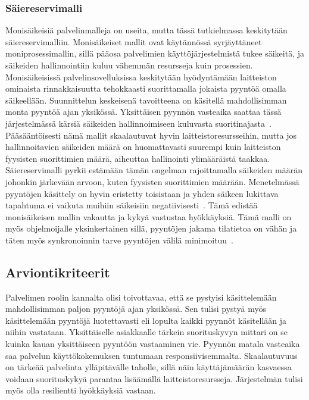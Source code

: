\documentclass[12pt]{article}
\begin{document}
\subsubsection{Säiereservimalli}
Monisäikeisiä palvelinmalleja on useita, mutta tässä tutkielmassa keskitytään säiereservimalliin.
Monisäikeiset mallit ovat käytännössä syrjäyttäneet moniprosessimallin, sillä pääosa
palvelimien käyttöjärjestelmistä tukee säikeitä, ja säikeiden hallinnointiin
kuluu vähemmän resursseja kuin prosessien.
Monisäikeisissä palvelinsovelluksissa keskitytään hyödyntämään laitteiston ominaista
rinnakkaisuutta tehokkaasti suorittamalla jokaista pyyntöä omalla säikeellään. Suunnittelun keskeisenä
tavoitteena on käsitellä mahdollisimman monta pyyntöä ajan yksikössä. Yksittäisen pyynnön
vasteaika saattaa tässä
järjestelmässä kärsiä säikeiden hallinnoimiseen kuluvasta suoritinajasta~\cite{easton_developing_2004}.
Pääsääntöisesti nämä mallit skaalautuvat hyvin laitteistoresursseihin,
mutta jos hallinnoitavien säikeiden määrä on huomattavasti suurempi kuin laitteiston
fyysisten suorittimien määrä, aiheuttaa hallinointi ylimääräistä taakkaa.
Säiereservimalli pyrkii estämään tämän ongelman rajoittamalla
säikeiden määrän johonkin järkevään arvoon, kuten fyysisten suorittimien
määrään.
Menetelmässä pyyntöjen käsittely on hyvin eristetty toisistaan ja
yhden säikeen lukittava tapahtuma ei vaikuta muihiin säikeisiin negatiivisesti~\cite{davis_case_2017}.
Tämä edistää monisäikeisen mallin vakautta ja kykyä vastustaa hyökkäyksiä.
Tämä malli on myös ohjelmoijalle yksinkertainen sillä, pyyntöjen jakama tilatietoa
on vähän ja täten myös synkronoinnin tarve pyyntöjen välilä minimoituu~\cite{hu_applying_1998}.



\subsection{Arviontikriteerit}
Palvelimen roolin kannalta olisi toivottavaa, että
se pystyisi käsittelemään mahdollisimman paljon pyyntöjä
ajan yksikössä. Sen tulisi pystyä myös käsittelemään pyyntöjä
luotettavasti eli lopulta kaikki pyynnöt käsitellään ja niihin vastataan.
Yksittäiselle asiakkaalle tärkein suorituskyvyn mittari on se kuinka kauan
yksittäiseen pyyntöön vastaaminen vie. Pyynnön matala vasteaika saa
palvelun käyttökokemuksen tuntumaan responsiivisemmalta.
Skaalautuvuus on tärkeää palvelinta ylläpitävälle taholle, sillä
näin käyttäjämäärän kasvaessa voidaan suorituskykyä parantaa
lisäämällä laitteistoresursseja. Järjestelmän tulisi myös
olla resilientti hyökkäyksiä vastaan.
\end{document}

